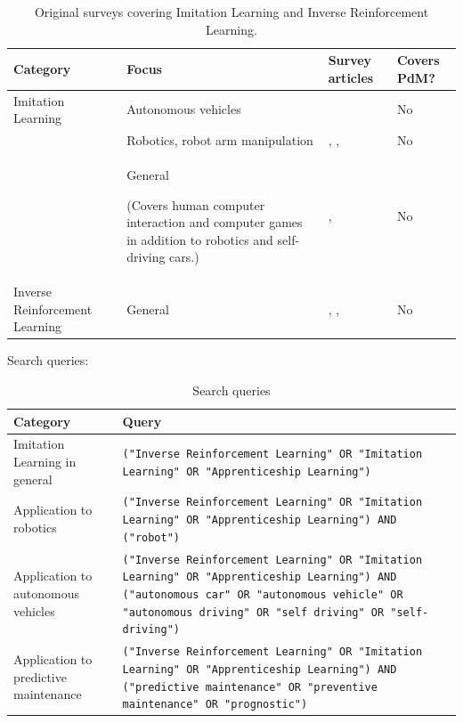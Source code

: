 \documentclass{article}
\begin{document}
\begingroup
\setlength{\tabcolsep}{6pt}
\begin{table}[h!]
	\renewcommand{\arraystretch}{1.5}
	\selectfont
	\begin{tabular}{L{2cm} L{5cm} L{4cm} L{2cm}}
		\midrule[0.01pt]
		\textbf{Category} & \textbf{Focus} & \textbf{Survey articles} & \textbf{Covers PdM?}\\ \midrule[0.01pt]
		Imitation Learning & Autonomous vehicles & \citet{le2022survey} & No\\
		& Robotics, robot arm manipulation & \citet{fang2019survey}, \citet{tai2016survey}, \citet{schaal1999}  & No\\
		& General \par(Covers human computer interaction and computer games in addition to robotics and self-driving cars.) & \citet{zare2024survey}, \citet{hussein2017survey} & No\\
		
		 \midrule[0.005pt]
		Inverse Reinforcement Learning & General & \citet{adams2022survey}, \citet{arora2021survey}, \citet{zhifei2012survey} & No\\
		\midrule[0.01pt]
	\end{tabular}
	\caption{Original surveys covering Imitation Learning and Inverse Reinforcement Learning.} \label{tbl:Surveys}
\end{table}
\endgroup


Search queries:
\begingroup
\setlength{\tabcolsep}{6pt}
\begin{table}[h!]
	\renewcommand{\arraystretch}{2.0}
	\selectfont
	\begin{tabular}{L{3cm} L{10cm}}
		\midrule[0.01pt]
		\textbf{Category} & \textbf{Query} \\ \midrule[0.01pt]
		Imitation Learning in general &  \texttt{("Inverse Reinforcement Learning" OR "Imitation Learning" OR "Apprenticeship Learning")} \\
		Application to robotics &  \texttt{("Inverse Reinforcement Learning" OR "Imitation Learning" OR "Apprenticeship Learning") AND ("robot")} \\
		Application to autonomous vehicles &  \texttt{("Inverse Reinforcement Learning" OR "Imitation Learning" OR "Apprenticeship Learning") AND ("autonomous car" OR "autonomous vehicle" OR "autonomous driving" OR "self driving" OR "self-driving")} \\ 
		Application to predictive maintenance &  \texttt{("Inverse Reinforcement Learning" OR "Imitation Learning" OR "Apprenticeship Learning") AND ("predictive maintenance" OR "preventive maintenance" OR "prognostic")} \\ 
		\midrule[0.01pt]
	\end{tabular}
	\caption{Search queries} \label{tbl:SLRQueries}
\end{table}
\endgroup
\end{document}
